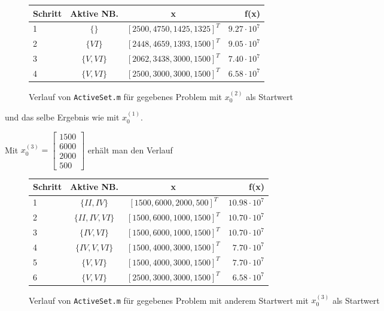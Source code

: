 \documentclass[a4paper, 12pt]{report}
\begin{document}
\begin{figure}[H]
  \centering
  \def\arraystretch{1.25}
  \begin{tabular}{l|c|c|r}
    \hline
    \textbf{Schritt} & \textbf{Aktive NB.} & \textbf{x} & \textbf{f(x)}\\
    \hline
    1 & $\{\}$ & $[2500, 4750, 1425, 1325]^T$ & $9.27 \cdot 10^7$\\
    2 & $\{VI\}$ & $[2448, 4659, 1393, 1500]^T$ & $9.05 \cdot 10^7$\\
    3 & $\{V, VI\}$ & $[2062, 3438, 3000, 1500]^T$ & $7.40 \cdot 10^7$\\
    4 & $\{V, VI\}$ & $[2500, 3000, 3000, 1500]^T$ & $6.58 \cdot 10^7$\\
    \hline
  \end{tabular}
  \caption{Verlauf von \lstinline[basicstyle=\ttfamily\color{black}]|ActiveSet.m| für gegebenes Problem mit $x_0^{(2)}$ als Startwert}
\end{figure}

und das selbe Ergebnis wie mit $x_0^{(1)}$.\par

Mit $x_0^{(3)} = \begin{bmatrix}1500\\6000\\2000\\500\end{bmatrix}$ erhält man den Verlauf

\begin{figure}[H]
  \centering
  \def\arraystretch{1.25}
  \begin{tabular}{l|c|c|r}
    \hline
    \textbf{Schritt} & \textbf{Aktive NB.} & \textbf{x} & \textbf{f(x)}\\
    \hline
    1 & $\{II, IV\}$ & $[1500, 6000, 2000, 500]^T$ & $10.98 \cdot 10^7$\\
    2 & $\{II, IV, VI\}$ & $[1500, 6000, 1000, 1500]^T$ & $10.70 \cdot 10^7$\\
    3 & $\{IV, VI\}$ & $[1500, 6000, 1000, 1500]^T$ & $10.70 \cdot 10^7$\\
    4 & $\{IV, V, VI\}$ & $[1500, 4000, 3000, 1500]^T$ & $7.70 \cdot 10^7$\\
    5 & $\{V, VI\}$ & $[1500, 4000, 3000, 1500]^T$ & $7.70 \cdot 10^7$\\
    6 & $\{V, VI\}$ & $[2500, 3000, 3000, 1500]^T$ & $6.58 \cdot 10^7$\\
    \hline
  \end{tabular}
  \caption{Verlauf von \lstinline[basicstyle=\ttfamily\color{black}]|ActiveSet.m| für gegebenes Problem mit anderem Startwert mit $x_0^{(3)}$ als Startwert}
\end{figure}
\end{document}
